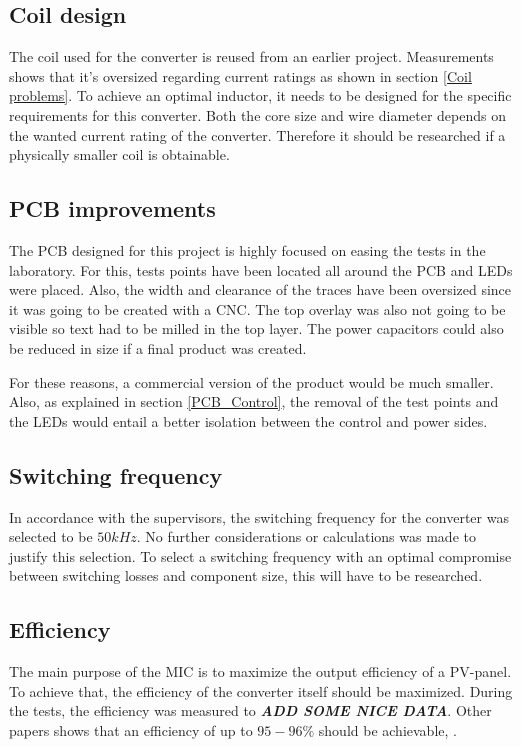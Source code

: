 
\subsection{Coil design}
The coil used for the converter is reused from an earlier project. Measurements shows that it's oversized regarding current ratings as shown in section \ref{Coil problems}. To achieve an optimal inductor, it needs to be designed for the specific requirements for this converter. Both the core size and wire diameter depends on the wanted current rating of the converter\cite{underthehood}. Therefore it should be researched if a physically smaller coil is obtainable.

\subsection{PCB improvements}
The PCB designed for this project is highly focused on easing the tests in the laboratory. For this, tests points have been located all around the PCB and LEDs were placed. Also, the width and clearance of the traces have been oversized since it was going to be created with a CNC. The top overlay was also not going to be visible so text had to be milled in the top layer. The power capacitors could also be reduced in size if a final product was created.

For these reasons, a commercial version of the product would be much smaller. Also, as explained in section \ref{PCB_Control}, the removal of the test points and the LEDs would entail a better isolation between the control and power sides.

\subsection{Switching frequency}
In accordance with the supervisors, the switching frequency for the converter was selected to be $50kHz$. No further considerations or calculations was made to justify this selection. To select a switching frequency with an optimal compromise between switching losses and component size, this will have to be researched. 


\subsection{Efficiency}
The main purpose of the MIC is to maximize the output efficiency of a PV-panel. To achieve that, the efficiency of the converter itself should be maximized. During the tests, the efficiency was measured to \textbf{\textit{ADD SOME NICE DATA}}. Other papers shows that an efficiency of up to $95-96\%$ should be achievable\cite{underthehood}, \cite{efficient_buckboost}. 